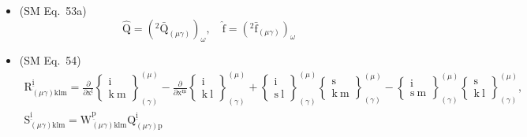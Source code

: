 \documentclass[12pt]{article}
\begin{document}
\begin{itemize}[label={},leftmargin=0pt]
    \item (SM Eq.\ 53a) 
    \[
    \widehat{\mathrm{Q}} = \left( {}^2\bar{\mathrm{Q}}_{(\mu\gamma)} \right)_\omega, \quad \hat{\mathrm{f}} = \left( {}^2\bar{\mathrm{f}}_{(\mu\gamma)} \right)_\omega
    \]

    \item (SM Eq.\ 54) 
    \[
    \begin{gathered}
    \mathrm{R}^{\underline{\mathrm{i}}}_{(\mu\gamma)\mathrm{klm}} = \frac{\partial}{\partial \mathrm{x}^{\underline{\mathrm{l}}}}\left\{ \begin{smallmatrix} \mathrm{i} \\ \mathrm{k\ m} \end{smallmatrix} \right\}^{(\mu)}_{(\gamma)} - \frac{\partial}{\partial \mathrm{x}^{\underline{\mathrm{m}}}}\left\{ \begin{smallmatrix} \mathrm{i} \\ \mathrm{k\ l} \end{smallmatrix} \right\}^{(\mu)}_{(\gamma)} + \left\{ \begin{smallmatrix} \mathrm{i} \\ \mathrm{s\ l} \end{smallmatrix} \right\}^{(\mu)}_{(\gamma)}\left\{ \begin{smallmatrix} \mathrm{s} \\ \mathrm{k\ m} \end{smallmatrix} \right\}^{(\mu)}_{(\gamma)} - \left\{ \begin{smallmatrix} \mathrm{i} \\ \mathrm{s\ m} \end{smallmatrix} \right\}^{(\mu)}_{(\gamma)}\left\{ \begin{smallmatrix} \mathrm{s} \\ \mathrm{k\ l} \end{smallmatrix} \right\}^{(\mu)}_{(\gamma)}, \\
    \mathrm{S}^{\underline{\mathrm{i}}}_{(\mu\gamma)\mathrm{klm}} = \mathrm{W}^{\underline{\mathrm{p}}}_{(\mu\gamma)\mathrm{klm}} \mathrm{Q}^{\underline{\mathrm{i}}}_{(\mu\gamma)\mathrm{p}}
    \end{gathered}
    \]


\end{itemize}
\end{document}
